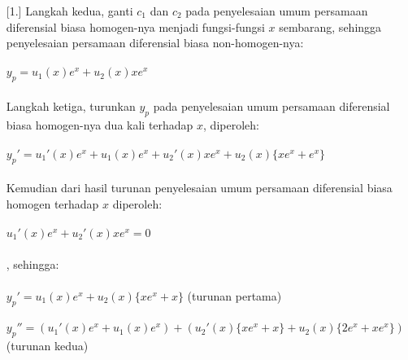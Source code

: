 \begin{enumerate} [1.]
	Langkah kedua, ganti \begin{math} c_1 \end{math} dan \begin{math} c_2 \end{math} pada penyelesaian umum persamaan diferensial biasa homogen-nya menjadi fungsi-fungsi \begin{math} x \end{math} sembarang, sehingga penyelesaian persamaan diferensial biasa non-homogen-nya: \\ \\
	\begin{math} y_p = u_1 (x) e^{x} + u_2 (x) xe^{x} \end{math} \\ \\
	Langkah ketiga, turunkan \begin{math} y_p \end{math} pada penyelesaian umum persamaan diferensial biasa homogen-nya dua kali terhadap \begin{math} x \end{math}, diperoleh: \\ \\
	\begin{math} y_p ' = u_1 ' (x) e^{x} + u_1 (x) e^{x} + u_2 ' (x) xe^{x} + u_2 (x) \big\{ xe^{x} + e^{x} \big\} \end{math} \\ \\
	Kemudian dari hasil turunan penyelesaian umum persamaan diferensial biasa homogen terhadap \begin{math} x \end{math} diperoleh: \\ \\
	\begin{math} u_1 ' (x) e^{x} + u_2 ' (x) xe^{x} = 0 \end{math} \\ \\
	, sehingga: \\ \\
	\begin{math} y_p ' = u_1 (x) e^{x} + u_2 (x) \big\{ xe^{x} + x \big\} \end{math} (turunan pertama) \\ \\
	\begin{math} y_p '' = (u_1 ' (x) e^{x} + u_1 (x) e^{x}) + (u_2 ' (x) \big\{ xe^{x} + x \big\} + u_2 (x) \big\{ 2e^{x} + xe^{x} \big\})  \end{math} (turunan kedua) \\ \\

\end{enumerate}
